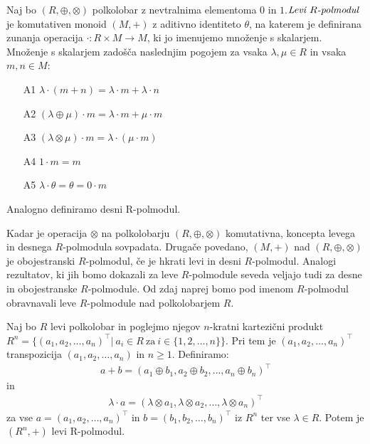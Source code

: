 \documentclass[mat1]{fmfdelo}
\newcommand{\pojem}[1]{\ensuremath{\emph{#1}}}
\newcommand{\map}[3]{\ensuremath{{#1}:{#2}\rightarrow{#3}}}
\begin{document}
\begin{definicija}\label{def:polmodul}
	Naj bo $(R, \oplus, \otimes)$ polkolobar z nevtralnima elementoma $0$ in $1$.\newline\pojem{Levi $R$-polmodul} je komutativen monoid $(M, +)$ z aditivno identiteto $\theta$, na katerem je definirana zunanja operacija \map{\cdot}{R\times M}{M}, ki jo imenujemo množenje s skalarjem. Množenje s skalarjem zadošča naslednjim pogojem za vsaka $\lambda,\mu\in R$ in vsaka $m, n\in M$:
	\begin{enumerate}
		\item[A1] $\lambda\cdot(m + n) = \lambda\cdot m + \lambda\cdot n$
		\item[A2] $(\lambda \oplus \mu)\cdot m = \lambda\cdot m + \mu\cdot m$
		\item[A3]  $(\lambda\otimes\mu) \cdot m = \lambda \cdot (\mu \cdot m)$
		\item[A4] $1\cdot m = m$
		\item[A5] $\lambda\cdot\theta = \theta = 0\cdot m$
	\end{enumerate}

Analogno definiramo desni R-polmodul.
\end{definicija}

	 Kadar je operacija $\otimes$ na polkolobarju $(R,\oplus, \otimes)$ komutativna, koncepta levega in desnega $R$-polmodula sovpadata. Drugače povedano, $(M, +)$ nad $(R, \oplus, \otimes)$ je obojestranski $R$-polmodul, če je hkrati levi in desni $R$-polmodul. Analogi rezultatov, ki jih bomo dokazali za leve $R$-polmodule seveda veljajo  tudi za desne in obojestranske $R$-polmodule. Od zdaj naprej bomo pod imenom $R$-polmodul obravnavali leve $R$-polmodule nad polkolobarjem $R$.

\begin{zgled}
	\label{zgled:Rnpolmodul}
	Naj bo $R$ levi polkolobar in poglejmo njegov $n$-kratni kartezični produkt $R^n = \{(a_1, a_2, \ldots, a_n)^{\top} |~ a_i \in R~\text{za}~i\in \{1, 2, \ldots, n\}\}$. Pri tem je $(a_1, a_2, \ldots, a_n)^{\top}$ transpozicija $(a_1, a_2, \ldots, a_n)$ in $n\geq 1$. Definiramo:
	\begin{align*}
		a + b = (a_1 \oplus b_1, a_2 \oplus b_2, \ldots, a_n \oplus b_n)^{\top}
	\end{align*}
	in
	\begin{align*}
		\lambda\cdot a = (\lambda\otimes a_1,\lambda\otimes a_2, \ldots,\lambda\otimes a_n)^{\top}
	\end{align*}
	za vse $a = (a_1, a_2, \ldots, a_n)^{\top}$ in $b = (b_1, b_2, \ldots, b_n)^{\top}$ iz $R^n$ ter vse $\lambda \in R$. Potem je $(R^n, +)$ levi R-polmodul.
\end{zgled}
\end{document}
